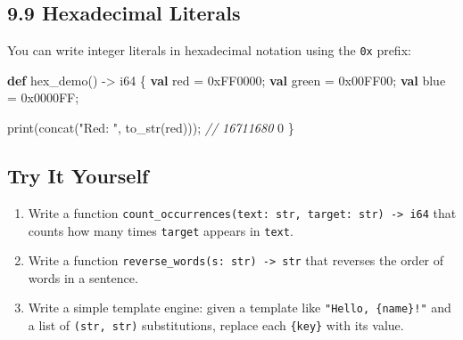 \documentclass[
  english,
]{book}
\newenvironment{Shaded}{\begin{snugshade}}{\end{snugshade}}
\newcommand{\BaseNTok}[1]{\textcolor[rgb]{0.71,0.81,0.66}{#1}}
\newcommand{\CommentTok}[1]{\textcolor[rgb]{0.42,0.60,0.33}{\textit{#1}}}
\newcommand{\DataTypeTok}[1]{\textcolor[rgb]{0.31,0.79,0.69}{#1}}
\newcommand{\DecValTok}[1]{\textcolor[rgb]{0.71,0.81,0.66}{#1}}
\newcommand{\FunctionTok}[1]{\textcolor[rgb]{0.86,0.86,0.67}{#1}}
\newcommand{\KeywordTok}[1]{\textcolor[rgb]{0.34,0.61,0.84}{\textbf{#1}}}
\newcommand{\NormalTok}[1]{\textcolor[rgb]{0.83,0.83,0.83}{#1}}
\newcommand{\OperatorTok}[1]{\textcolor[rgb]{0.83,0.83,0.83}{#1}}
\newcommand{\StringTok}[1]{\textcolor[rgb]{0.81,0.57,0.47}{#1}}
\providecommand{\tightlist}{%
  \setlength{\itemsep}{0pt}\setlength{\parskip}{0pt}}
\begin{document}
\subsection{9.9 Hexadecimal Literals}\label{hexadecimal-literals-1}

You can write integer literals in hexadecimal notation using the
\texttt{0x} prefix:

\begin{Shaded}
\begin{Highlighting}[]
\KeywordTok{def}\NormalTok{ hex\_demo() }\OperatorTok{{-}\textgreater{}} \DataTypeTok{i64}\NormalTok{ \{}
    \KeywordTok{val}\NormalTok{ red }\OperatorTok{=} \BaseNTok{0xFF0000}\NormalTok{;}
    \KeywordTok{val}\NormalTok{ green }\OperatorTok{=} \BaseNTok{0x00FF00}\NormalTok{;}
    \KeywordTok{val}\NormalTok{ blue }\OperatorTok{=} \BaseNTok{0x0000FF}\NormalTok{;}
    
    \FunctionTok{print}\NormalTok{(}\FunctionTok{concat}\NormalTok{(}\StringTok{"Red: "}\NormalTok{, }\FunctionTok{to\_str}\NormalTok{(red))); }\CommentTok{// 16711680}
    \DecValTok{0}
\NormalTok{\}}
\end{Highlighting}
\end{Shaded}

\subsection{Try It Yourself}\label{try-it-yourself-8}

\begin{enumerate}
\def\labelenumi{\arabic{enumi}.}
\tightlist
\item
  Write a function
  \texttt{count\_occurrences(text:\ str,\ target:\ str)\ -\textgreater{}\ i64}
  that counts how many times \texttt{target} appears in \texttt{text}.
\item
  Write a function
  \texttt{reverse\_words(s:\ str)\ -\textgreater{}\ str} that reverses
  the order of words in a sentence.
\item
  Write a simple template engine: given a template like
  \texttt{"Hello,\ \{name\}!"} and a list of \texttt{(str,\ str)}
  substitutions, replace each \texttt{\{key\}} with its value.
\end{enumerate}
\end{document}
